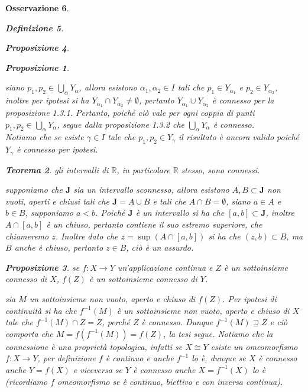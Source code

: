 \documentclass[oneside, 11pt]{amsbook}
\makeatletter
\newcommand{\0}{{(0)}}
\newcommand{\3}{{(3)}}
\theoremstyle{colonplain}
\newtheorem{thm}{Teorema}[chapter]
\newtheorem{prop}[thm]{Proposizione}
\theoremstyle{colondefinition}
\newtheorem{defn}[thm]{Definizione}
\theoremstyle{colonremark}
\newtheorem{rmk}[thm]{Osservazione}
\numberwithin{equation}{chapter}
\renewcommand{\proofname}{Dimostrazione}
\renewenvironment{proof}[1][\proofname]{\par
  \pushQED{\end{proof}}%
  \normalfont \topsep6\p@\@plus6\p@\relax
  \trivlist
  \item[\hskip\labelsep\bfseries #1:]\ignorespaces
}{%
  \popQED\endtrivlist\@endpefalse
}
\makeatother
\begin{document}
\begin{rmk}
\begin{defn}
\begin{prop}
\begin{prop}
\end{prop}
\begin{proof}
siano $p_1, p_2 \in \bigcup_\alpha Y_\alpha$, allora esistono $\alpha_1, \alpha_2 \in I$ tali che $p_1 \in Y_{\alpha_1}$ e $p_2 \in Y_{\alpha_2}$, inoltre per ipotesi si ha $Y_{\alpha_1} \cap Y_{\alpha_2} \neq \emptyset$, pertanto $Y_{\alpha_1} \cup Y_{\alpha_2}$ è connesso per la \textit{proposizione 1.3.1}. Pertanto, poiché ciò vale per ogni coppia di punti $p_1, p_2 \in \bigcup_\alpha Y_\alpha$, segue dalla \textit{proposizione 1.3.2} che $\bigcup_\alpha Y_\alpha$ è connesso. \\
Notiamo che se esiste $\gamma \in I$ tale che $p_1, p_2 \in Y_\gamma$ il risultato è ancora valido poiché $Y_\gamma$ è connesso per ipotesi.
\end{proof}
\begin{thm}
gli intervalli di $\mathbb{R}$, in particolare $\mathbb{R}$ stesso, sono connessi.
\end{thm}
\begin{proof}
supponiamo che $\mathbf{J}$ sia un intervallo sconnesso, allora esistono $A, B \subset \mathbf{J}$ non vuoti, aperti e chiusi tali che $\mathbf{J} = A \cup B$ e tali che $A \cap B = \emptyset$, siano $a \in A$ e $b \in B$, supponiamo $a < b$. Poiché $\mathbf{J}$ è un intervallo si ha che $[a, b] \subset \mathbf{J}$, inoltre $A \cap [a, b]$ è un chiuso, pertanto contiene il suo estremo superiore, che chiameremo $z$. Inoltre dato che $z = \sup (A \cap [a, b])$ si ha che $(z, b) \subset B$, ma $B$ anche è chiuso, pertanto $z \in B$, ciò è un assurdo.
\end{proof}
\begin{prop}
se $f : X \longrightarrow Y$ un'applicazione continua e $Z$ è un sottoinsieme connesso di $X$, $f(Z)$ è un sottoinsieme connesso di $Y$.
\end{prop}
\begin{proof}
sia $M$ un sottoinsieme non vuoto, aperto e chiuso di $f(Z)$. Per ipotesi di continuità si ha che $f^{-1}(M)$ è un sottoinsieme non vuoto, aperto e chiuso di $X$ tale che $f^{-1}(M) \cap Z = Z$, perché $Z$ è connesso. Dunque $f^{-1}(M) \supseteq Z$ e ciò comporta che $M = f(f^{-1}(M)) = f(Z)$, la tesi segue.
\end{proof}
Notiamo che la \textit{connessione} è una \textit{proprietà topologica}, infatti se $X \cong Y$ esiste un omeomorfismo $f : X \longrightarrow Y$, per definizione $f$ è continuo e anche $f^{-1}$ lo è, dunque se $X$ è connesso anche $Y = f(X)$ e viceversa se $Y$ è connesso anche $X = f^{-1}(X)$ lo è (ricordiamo $f$ omeomorfismo se è continuo, biettivo e con inversa continua). \\ \\

\end{prop}
\end{defn}
\end{rmk}
\end{document}
